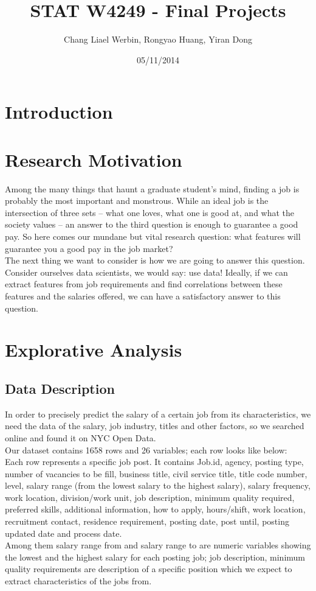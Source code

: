 \documentclass[9pt,notitlepage]{article}		%
\title{STAT W4249 - Final Projects}
\author{Chang Liael Werbin, Rongyao Huang, Yiran Dong}
\date{05/11/2014}
\begin{document}
\maketitle

\section{Introduction}

\section{Research Motivation}
Among the many things that haunt a graduate student's mind, finding a job is probably the most important and monstrous. While an ideal job is the intersection of three sets – what one loves, what one is good at, and what the society values – an answer to the third question is enough to guarantee a good pay. So here comes our mundane but vital research question: what features will guarantee you a good pay in the job market?\\
The next thing we want to consider is how we are going to answer this question. Consider ourselves data scientists, we would say: use data! Ideally, if we can extract features from job requirements and find correlations between these features and the salaries offered, we can have a satisfactory answer to this question.
\section{Explorative Analysis}

\subsection{Data Description}
In order to precisely predict the salary of a certain job from its characteristics, we need the data of the salary, job industry, titles and other factors, so we searched online and found it on NYC Open Data.\\
Our dataset contains 1658 rows and 26 variables; each row looks like below:\\
Each row represents a specific job post. It contains Job.id, agency, posting type, number of vacancies to be fill, business title, civil service title, title code number, level, salary range (from the lowest salary to the highest salary), salary frequency, work location, division/work unit, job description, minimum quality required, preferred skills, additional information, how to apply, hours/shift, work location, recruitment contact, residence requirement, posting date, post until, posting updated date and process date.\\
Among them salary range from and salary range to are numeric variables showing the lowest and the highest salary for each posting job; job description, minimum quality requirements are description of a specific position which we expect to extract characteristics of the jobs from.
\end{document}
